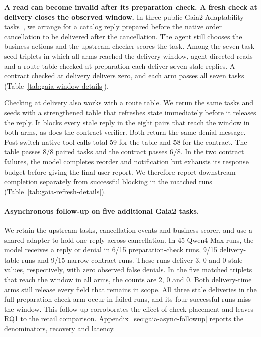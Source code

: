 \textbf{A read can become invalid after its preparation check. A fresh check at delivery closes the observed window.}
In three public Gaia2 Adaptability tasks~\cite{gaia2data}, we arrange for a catalog reply prepared before the native order cancellation to be delivered after the cancellation. The agent still chooses the business actions and the upstream checker scores the task. Among the seven task-seed triplets in which all arms reached the delivery window, agent-directed reads and a route table checked at preparation each deliver seven stale replies. A contract checked at delivery delivers zero, and each arm passes all seven tasks (Table~\ref{tab:gaia-window-details}).

Checking at delivery also works with a route table. We rerun the same tasks and seeds with a strengthened table that refreshes state immediately before it releases the reply. It blocks every stale reply in the eight pairs that reach the window in both arms, as does the contract verifier. Both return the same denial message. Post-switch native tool calls total 59 for the table and 58 for the contract. The table passes 8/8 paired tasks and the contract passes 6/8. In the two contract failures, the model completes reorder and notification but exhausts its response budget before giving the final user report. We therefore report downstream completion separately from successful blocking in the matched runs (Table~\ref{tab:gaia-refresh-details}).

\paragraph{Asynchronous follow-up on five additional Gaia2 tasks.}
We retain the upstream tasks, cancellation events and business scorer, and use a shared adapter to hold one reply across cancellation. In 45 Qwen4-Max runs, the model receives a reply or denial in 6/15 preparation-check runs, 9/15 delivery-table runs and 9/15 narrow-contract runs. These runs deliver 3, 0 and 0 stale values, respectively, with zero observed false denials. In the five matched triplets that reach the window in all arms, the counts are 2, 0 and 0. Both delivery-time arms still release every field that remains in scope. All three stale deliveries in the full preparation-check arm occur in failed runs, and its four successful runs miss the window. This follow-up corroborates the effect of check placement and leaves RQ1 to the retail comparison. Appendix~\ref{sec:gaia-async-followup} reports the denominators, recovery and latency.

